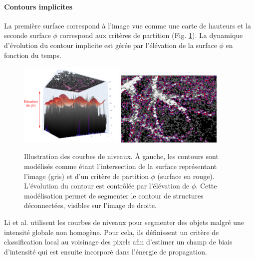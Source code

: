       \paragraph{Contours implicites} 
       La première surface correspond à l'image vue comme une carte de hauteurs et la seconde surface $\phi$ correspond aux critères de partition (Fig. \ref{fig:level_set}). La dynamique d'évolution du contour implicite est gérée par l'élévation de la surface $\phi$ en fonction du temps. 
      \begin{figure}[h]
        \centering
        \includegraphics[width=0.45\textwidth]{Images/levelSet_1.png}
        \includegraphics[width=0.45\textwidth]{Images/levelSet_2.png}
        \caption{Illustration des courbes de niveaux. À gauche, les contours sont modélisés comme étant l'intersection de la surface représentant l'image (gris) et d'un critère de partition $\phi$ (surface en rouge). L'évolution du contour est contrôlée par l'élévation de $\phi$. Cette modélisation permet de segmenter le contour de structures déconnectées, visibles sur l'image de droite.}
        \label{fig:level_set}
      \end{figure}
      Li et al. \cite{Li2011_mri_level_set} utilisent les courbes de niveaux pour segmenter des objets malgré une intensité globale non homogène. Pour cela, ils définissent un critère de classification local au voisinage des pixels afin d'estimer un champ de biais d'intensité qui est ensuite incorporé dans l'énergie de propagation.

